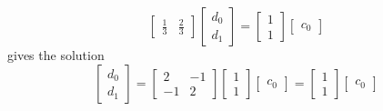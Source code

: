 \begin{example}
\begin{equation*}
\begin{bmatrix}
            \frac{1}{3} & \frac{2}{3}
        \end{bmatrix}
        \begin{bmatrix}
            d_0 \\
            d_1
        \end{bmatrix}
        =
        \begin{bmatrix}
            1 \\
            1
        \end{bmatrix}
        \begin{bmatrix}
            c_0
        \end{bmatrix}
    \end{equation*}
    gives the solution
    \begin{equation*}
        \begin{bmatrix}
            d_0 \\
            d_1
        \end{bmatrix}
        =
        \begin{bmatrix}
            2 & -1 \\
            -1 & 2
        \end{bmatrix}
        \begin{bmatrix}
            1 \\
            1
        \end{bmatrix}
        \begin{bmatrix}
            c_0
        \end{bmatrix}
        =
        \begin{bmatrix}
            1 \\
            1
        \end{bmatrix}
        \begin{bmatrix}
            c_0
        \end{bmatrix}
    \end{equation*}
\end{example}


